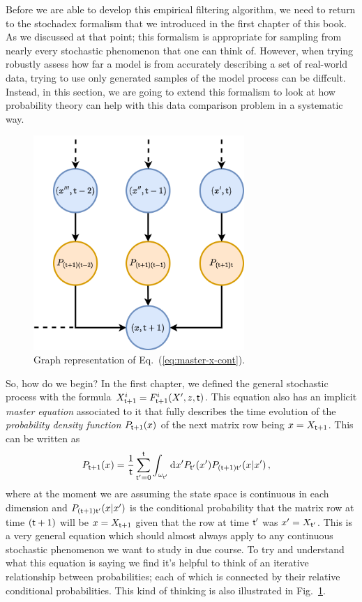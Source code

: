 Before we are able to develop this empirical filtering algorithm, we need to return to the stochadex formalism that we introduced in the first chapter of this book. As we discussed at that point; this formalism is appropriate for sampling from nearly every stochastic phenomenon that one can think of. However, when trying robustly assess how far a model is from accurately describing a set of real-world data, trying to use only generated samples of the model process can be diffcult. Instead, in this section, we are going to extend this formalism to look at how probability theory can help with this data comparison problem in a systematic way.

\begin{figure}[h]
\centering
\includegraphics[width=8cm]{images/chapter-4-master-eq-graph.drawio.png}
\caption{Graph representation of Eq.~(\ref{eq:master-x-cont}).}
\label{fig:master-eqn}
\end{figure} 

So, how do we begin? In the first chapter, we defined the general stochastic process with the formula $X^{i}_{{\sf t}+1} = F^{i}_{{\sf t}+1}(X',z,{\sf t})$. This equation also has an implicit \emph{master equation} associated to it that fully describes the time evolution of the \emph{probability density function} $P_{{\sf t}+1}(x)$ of the next matrix row being $x=X_{{\sf t}+1}$. This can be written as
\begin{align}
P_{{\sf t}+1}(x) &= \frac{1}{{\sf t}}\sum_{{\sf t}'=0}^{{\sf t}}\int_{\omega_{{\sf t}'}}{\rm d}x' P_{{\sf t}'}(x') P_{({\sf t}+1){\sf t}'}(x\vert x') \label{eq:master-x-cont} \,,
\end{align}
where at the moment we are assuming the state space is continuous in each dimension and $P_{({\sf t}+1){\sf t}'}(x\vert x')$ is the conditional probability that the matrix row at time $({\sf t}+1)$ will be $x=X_{{\sf t}+1}$ given that the row at time ${\sf t}'$ was $x'=X_{{\sf t}'}$. This is a very general equation which should almost always apply to any continuous stochastic phenomenon we want to study in due course. To try and understand what this equation is saying we find it's helpful to think of an iterative relationship between probabilities; each of which is connected by their relative conditional probabilities. This kind of thinking is also illustrated in Fig.~\ref{fig:master-eqn}.

